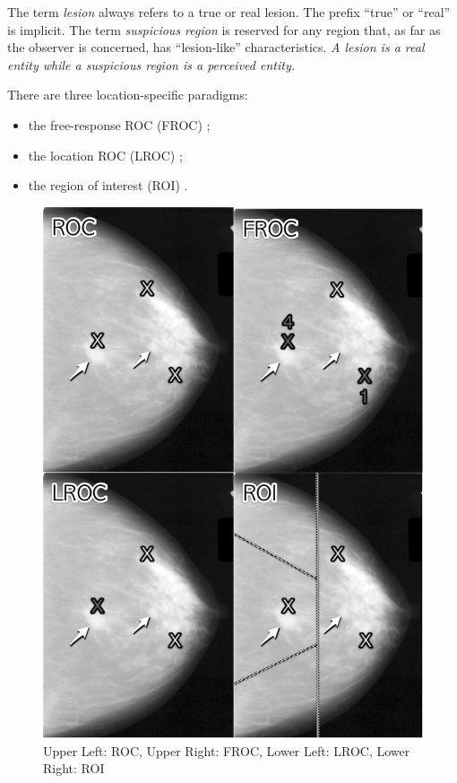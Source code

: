\documentclass[
]{book}
\providecommand{\tightlist}{%
  \setlength{\itemsep}{0pt}\setlength{\parskip}{0pt}}
\begin{document}
The term \emph{lesion} always refers to a true or real lesion. The prefix ``true'' or ``real'' is implicit. The term \emph{suspicious region} is reserved for any region that, as far as the observer is concerned, has ``lesion-like'' characteristics. \emph{A lesion is a real entity while a suspicious region is a perceived entity.}

There are three location-specific paradigms:

\begin{itemize}
\tightlist
\item
  the free-response ROC (FROC) \citep{bunch1977free, chakraborty1989maximum};
\item
  the location ROC (LROC) \citep{starr1977comments, swensson1996unified};
\item
  the region of interest (ROI) \citep{obuchowski2010data}.
\end{itemize}

\begin{figure}
\includegraphics[width=1\linewidth]{images/4Paradigms} \caption{Upper Left: ROC, Upper Right: FROC, Lower Left: LROC, Lower Right: ROI}\label{fig:froc-paradigm-4}
\end{figure}
\end{document}
